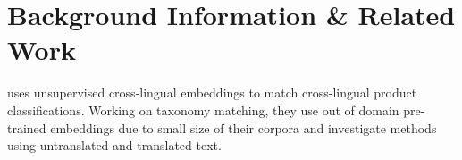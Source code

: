 
\chapter{Background Information \& Related Work}\label{chap:background_n_related}

\textcite{gordeev_unsupervised_2018} uses unsupervised cross-lingual embeddings to match cross-lingual product classifications.
Working on taxonomy matching, they use out of domain pre-trained embeddings due to small size of their corpora %
and investigate methods using untranslated and translated text.
